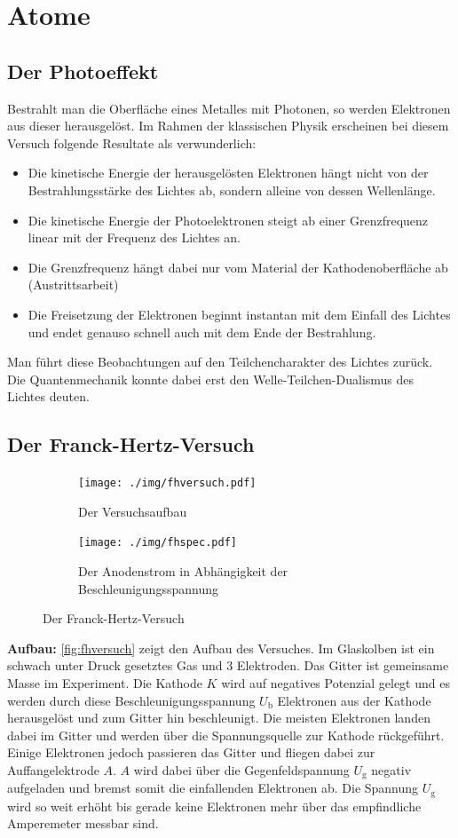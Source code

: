 \chapter{Atome}

\section{Der Photoeffekt}
Bestrahlt man die Oberfläche eines Metalles mit Photonen, so werden Elektronen aus dieser herausgelöst.
Im Rahmen der klassischen Physik erscheinen bei diesem Versuch folgende Resultate als verwunderlich:
\begin{itemize}
	\item Die kinetische Energie der herausgelösten Elektronen hängt nicht von der Bestrahlungsstärke des Lichtes ab, sondern alleine von dessen Wellenlänge.
	\item Die kinetische Energie der Photoelektronen steigt ab einer Grenzfrequenz linear mit der Frequenz des Lichtes an.
	\item Die Grenzfrequenz hängt dabei nur vom Material der Kathodenoberfläche ab (Austrittsarbeit)
	\item Die Freisetzung der Elektronen beginnt instantan mit dem Einfall des Lichtes und endet genauso schnell auch mit dem Ende der Bestrahlung.
\end{itemize}

Man führt diese Beobachtungen auf den Teilchencharakter des Lichtes zurück.
Die Quantenmechanik konnte dabei erst den Welle-Teilchen-Dualismus des Lichtes deuten.

\section{Der Franck-Hertz-Versuch}
\begin{figure}
	\centering
	\begin{subfigure}{0.4\textwidth}
		\centering
		\texttt{[image: ./img/fhversuch.pdf]}
		\caption{Der Versuchsaufbau}
		\label{fig:fhversuch}
	\end{subfigure}
	\begin{subfigure}{0.4\textwidth}
		\centering
		\texttt{[image: ./img/fhspec.pdf]}
		\caption{Der Anodenstrom in Abhängigkeit der Beschleunigungsspannung}
		\label{fig:fhspec}
	\end{subfigure}
	\caption{Der Franck-Hertz-Versuch}
\end{figure}
\textbf{Aufbau:}  \autoref{fig:fhversuch} zeigt den Aufbau des Versuches.
Im Glaskolben ist ein schwach unter Druck gesetztes Gas und 3 Elektroden.
Das Gitter ist gemeinsame Masse im Experiment.
Die Kathode $K$ wird auf negatives Potenzial gelegt und es werden durch diese Beschleunigungsspannung $U_\text{b}$ Elektronen aus der Kathode herausgelöst und zum Gitter hin beschleunigt.
Die meisten Elektronen landen dabei im Gitter und werden über die Spannungsquelle zur Kathode rückgeführt.
Einige Elektronen jedoch passieren das Gitter und fliegen dabei zur Auffangelektrode $A$.
$A$ wird dabei über die Gegenfeldspannung $U_\text{g}$ negativ aufgeladen und bremst somit die einfallenden Elektronen ab.
Die Spannung $U_\text{g}$ wird so weit erhöht bis gerade keine Elektronen mehr über das empfindliche Amperemeter messbar sind.

